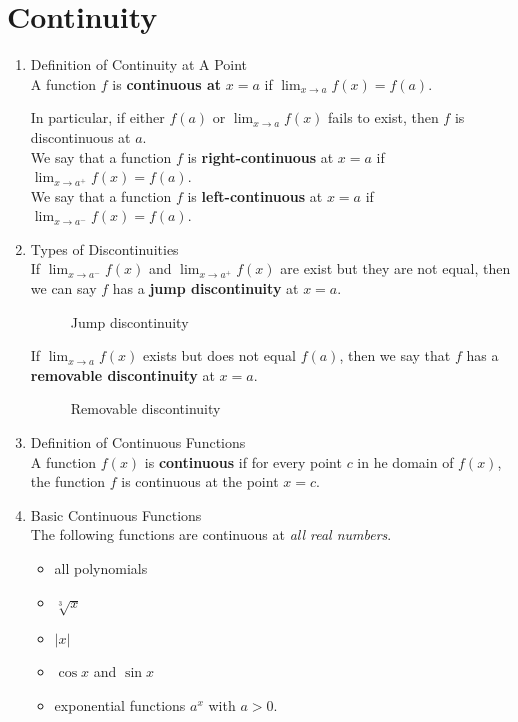 \section{Continuity}
\begin{enumerate}
    \item Definition of Continuity at A Point \\
        A function $f$ is \textbf{continuous at} $x=a$ if $\lim_{x\to a} f(x)=f(a)$.

        In particular, if either $f(a)$ or $\lim_{x\to a} f(x)$ fails to exist, then $f$ is discontinuous at $a$. \\
        We say that a function $f$ is \textbf{right-continuous} at $x=a$ if $\lim_{x\to a^+} f(x)=f(a)$. \\
        We say that a function $f$ is \textbf{left-continuous} at $x=a$ if $\lim_{x\to a^-} f(x)=f(a)$.
    \item Types of Discontinuities \\
        If $\lim_{x\to a^-} f(x)$ and $\lim_{x\to a^+} f(x)$ are exist but they are not equal, then we can say $f$ has a \textbf{jump discontinuity} at $x=a$.
        \begin{figure}[H]
            \centering
            \caption{Jump discontinuity}
        \end{figure}
        If $\lim_{x\to a} f(x)$ exists but does not equal $f(a)$, then we say that $f$ has a \textbf{removable discontinuity} at $x=a$.
		\begin{figure}[H]
			\centering
			\caption{Removable discontinuity}
		\end{figure}
   \item Definition of Continuous Functions \\
       A function $f(x)$ is \textbf{continuous} if for every point $c$ in he domain of $f(x)$, the function $f$ is continuous at the point $x=c$.
    \item Basic Continuous Functions \\
        The following functions are continuous at \textit{all real numbers}.
        \begin{itemize}
            \item all polynomials
            \item $\sqrt[3]{x}$ 
            \item $|x|$
            \item $\cos x$ and $\sin x$
            \item exponential functions $a^x$ with $a>0$.

\end{itemize}
\end{enumerate}
